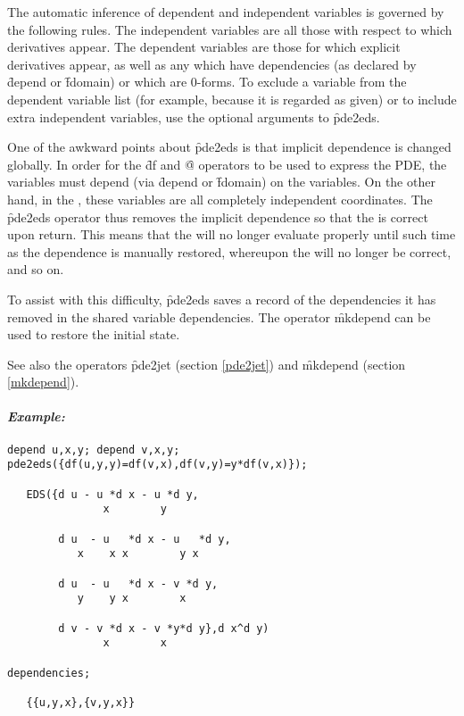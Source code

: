 The automatic inference of dependent and independent variables is governed
by the following rules. The independent variables are all those with
respect to which derivatives appear. The dependent variables are those
for which explicit derivatives appear, as well as any which have
dependencies (as declared by \f{depend} or \f{fdomain}) or which are 0-forms.
To exclude a variable from the dependent variable list (for example,
because it is regarded as given) or to include extra independent variables,
use the optional arguments to \f{pde2eds}.

One of the awkward points about \f{pde2eds} is that implicit dependence
is changed globally. In order for the \f{df} and \f{@} operators to be used
to express the PDE, the  variables must depend (via
\f{depend} or \f{fdomain}) on the  variables. On the
other hand, in the , these variables are all completely
independent coordinates. The \f{pde2eds} operator thus removes the implicit
dependence so that the  is correct upon return. This means that
the  will no longer evaluate properly until such time as the
dependence is manually restored, whereupon the  will no longer be
correct, and so on.

To assist with this difficulty, \f{pde2eds} saves a record of the
dependencies it has removed in the shared variable \f{dependencies}. The
operator \f{mkdepend} can be used to restore the initial state.

See also the operators \f{pde2jet} (section \ref{pde2jet}) and \f{mkdepend}
(section \ref{mkdepend}).

\paragraph{\emph{Example:}}
\begin{verbatim}
depend u,x,y; depend v,x,y;
pde2eds({df(u,y,y)=df(v,x),df(v,y)=y*df(v,x)});

   EDS({d u - u *d x - u *d y,
               x        y

        d u  - u   *d x - u   *d y,
           x    x x        y x

        d u  - u   *d x - v *d y,
           y    y x        x

        d v - v *d x - v *y*d y},d x^d y)
               x        x

dependencies;

   {{u,y,x},{v,y,x}}
\end{verbatim}

